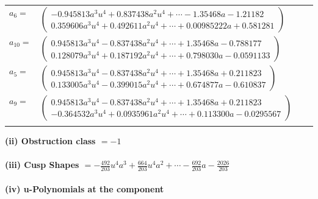 \documentclass[1p]{elsarticle_modified}
\theoremstyle{definition}
\begin{document}
\begin{tabular}{m{7pt} m{180pt} m{7pt} m{180pt} }
\flushright $a_{6}=$&$\begin{pmatrix}-0.945813 a^{3} u^{4}+0.837438 a^{2} u^{4}+\cdots-1.35468 a-1.21182\\0.359606 a^{3} u^{4}+0.492611 a^{2} u^{4}+\cdots+0.00985222 a+0.581281\end{pmatrix}$ \\
\flushright $a_{10}=$&$\begin{pmatrix}0.945813 a^{3} u^{4}-0.837438 a^{2} u^{4}+\cdots+1.35468 a-0.788177\\0.128079 a^{3} u^{4}+0.187192 a^{2} u^{4}+\cdots+0.798030 a-0.0591133\end{pmatrix}$ \\
\flushright $a_{5}=$&$\begin{pmatrix}0.945813 a^{3} u^{4}-0.837438 a^{2} u^{4}+\cdots+1.35468 a+0.211823\\0.133005 a^{3} u^{4}-0.399015 a^{2} u^{4}+\cdots+0.674877 a-0.610837\end{pmatrix}$ \\
\flushright $a_{9}=$&$\begin{pmatrix}0.945813 a^{3} u^{4}-0.837438 a^{2} u^{4}+\cdots+1.35468 a+0.211823\\-0.364532 a^{3} u^{4}+0.0935961 a^{2} u^{4}+\cdots+0.113300 a-0.0295567\end{pmatrix}$\\&\end{tabular}
\flushleft \textbf{(ii) Obstruction class $= -1$}\\~\\
\flushleft \textbf{(iii) Cusp Shapes $= -\frac{492}{203} u^4 a^3+\frac{664}{203} u^4 a^2+\cdots-\frac{692}{203} a-\frac{2026}{203}$}\\~\\
\newpage\renewcommand{\arraystretch}{1}
\flushleft \textbf{(iv) u-Polynomials at the component}\newline \\
\end{document}
